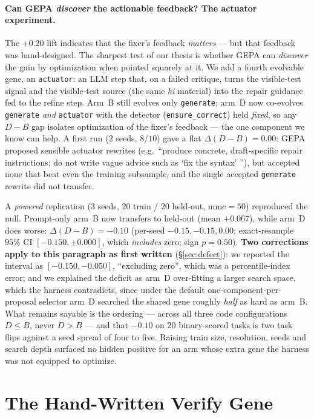 \documentclass[11pt]{article}
\newcommand{\dd}{\ensuremath{\Delta}}
\begin{document}
\paragraph{Can GEPA \emph{discover} the actionable feedback? The actuator experiment.}
The $+0.20$ lift indicates that the fixer's feedback \emph{matters} --- but that feedback
was hand-designed. The sharpest test of our thesis is whether GEPA can \emph{discover} the
gain by optimization when pointed squarely at it. We add a fourth evolvable gene, an
\texttt{actuator}: an LLM step that, on a failed critique, turns the visible-test signal and
the visible-test source (the same \emph{hi} material) into the repair guidance fed to the
refine step. Arm~B still evolves only \texttt{generate}; arm~D now co-evolves \texttt{generate}
\emph{and} \texttt{actuator} with the detector (\texttt{ensure\_correct}) held \emph{fixed}, so
any $D-B$ gap isolates optimization of the fixer's feedback --- the one component we know can
help. A first run ($2$ seeds, $8$/$10$) gave a flat $\dd(D-B)=0.00$: GEPA proposed sensible
actuator rewrites (e.g.\ ``produce concrete, draft-specific repair instructions; do not write
vague advice such as `fix the syntax' ''), but accepted none that beat even the training
subsample, and the single accepted \texttt{generate} rewrite did not transfer.

A \emph{powered} replication ($3$ seeds, $20$ train / $20$ held-out, $\mathrm{mmc}=50$)
reproduced the null. Prompt-only arm~B now transfers to held-out (mean $+0.067$), while arm~D
does worse: $\dd(D-B) = -0.10$ (per-seed $-0.15, -0.15, 0.00$; exact-resample $95\%$ CI
$[-0.150, +0.000]$, which \emph{includes} zero; sign $p = 0.50$). \textbf{Two corrections
apply to this paragraph as first written} (\S\ref{sec:defect}): we reported the interval as
$[-0.150,-0.050]$, ``excluding zero'', which was a percentile-index error; and we explained
the deficit as arm~D over-fitting a larger search space, which the harness contradicts, since
under the default one-component-per-proposal selector arm~D searched the shared gene roughly
\emph{half} as hard as arm~B. What remains sayable is the ordering --- across all three code
configurations $D \le B$, never $D > B$ --- and that $-0.10$ on $20$ binary-scored tasks is
two task flips against a seed spread of four to five. Raising train size, resolution, seeds
and search depth surfaced no hidden positive for an arm whose extra gene the harness was not
equipped to optimize.


\section{The Hand-Written Verify Gene}
\label{sec:handgene}
\end{document}

